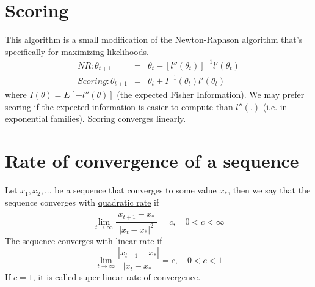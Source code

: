 \documentclass[12pt,a4paper]{article}
\begin{document}
\section{Scoring}
This algorithm is a small modification of the Newton-Raphson algorithm  that's specifically for maximizing likelihoods.
\begin{eqnarray}
\textit{NR}: \theta_{t+1} &=& \theta_t - [l''(\theta_t)]^{-1}l'(\theta_t) \nonumber\\
\textit{Scoring}: \theta_{t+1} &=& \theta_t + I^{-1}(\theta_t)l'(\theta_t) \nonumber
\end{eqnarray}
where $I(\theta) = E[-l''(\theta)]$ (the expected Fisher Information). We may prefer scoring if the expected information is easier to compute than $l''(.)$ (i.e. in exponential families). Scoring converges linearly.

\section{Rate of convergence of a sequence}
Let $x_1, x_2,...$ be a sequence that converges to some value $x_*$, then we say that the sequence converges with \underline{quadratic rate} if 
\[
\lim_{t\rightarrow\infty} \frac{|x_{t+1}-x_*|}{|x_t-x_*|^2} = c, \quad 0 < c < \infty
\]
The sequence converges with \underline{linear rate} if
\[
\lim_{t\rightarrow\infty} \frac{|x_{t+1}-x_*|}{|x_t-x_*|} = c, \quad 0 < c < 1
\]
If $c = 1$, it is called super-linear rate of convergence.
\end{document}
